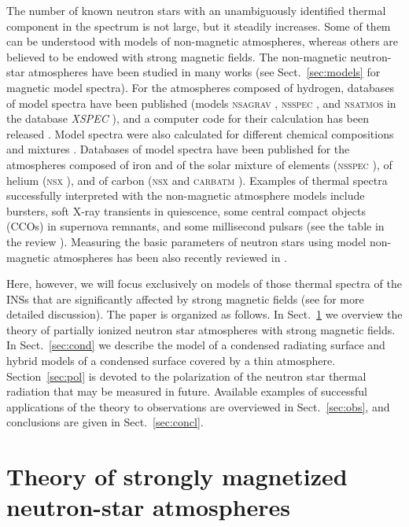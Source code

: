 \documentclass{pos1}
\begin{document}
The number of known neutron stars with an unambiguously identified
thermal component in the spectrum is not large, but it steadily
increases. Some of them can be understood with models of non-magnetic
atmospheres, whereas others are believed to be endowed with strong
magnetic fields. The non-magnetic neutron-star
atmospheres have been studied in many works
(see Sect.~\ref{sec:models} for magnetic model spectra).
For the atmospheres composed of hydrogen, databases of model spectra 
have been published (models \textsc{nsagrav} \cite{ZavlinPS96},
\textsc{nsspec} \cite{GaensickeBR02}, and \textsc{nsatmos}
\cite{Heinke_ea06} in the database \textit{XSPEC} \cite{XSPEC}), and a
computer code for their calculation has been released
\cite{Haakonsen_ea12}. Model spectra were also calculated for
different chemical compositions
\cite{GaensickeBR02,RajagopalRomani96,Pons_ea02,Heinke_ea06,HoHeinke09,Suleimanov_ea14}
and mixtures \cite{GaensickeBR02,Pons_ea02}. Databases of model
spectra have been published for the atmospheres
composed of iron and of the solar mixture of elements (\textsc{nsspec}
\cite{GaensickeBR02}), of helium (\textsc{nsx} \cite{HoHeinke09}), and
of carbon (\textsc{nsx} \cite{HoHeinke09} and \textsc{carbatm}
\cite{Suleimanov_ea14}). Examples of thermal spectra 
successfully interpreted with the non-magnetic atmosphere models
include bursters, soft X-ray
transients in quiescence, some central compact objects (CCOs) in
supernova remnants, and some millisecond pulsars (see the table in
the review \cite{P14}). Measuring the basic parameters of neutron
stars using model non-magnetic atmospheres has been also recently
reviewed in \cite{Suleimanov_ea16}.

Here, however, we will focus exclusively on models of
those thermal spectra of the INSs that are significantly affected by
strong magnetic fields
(see \cite{P14} for more detailed discussion).
The paper is organized as follows. In
Sect.~\ref{sec:theory} we overview the theory of partially ionized
neutron star atmospheres with strong magnetic fields. In
Sect.~\ref{sec:cond} we describe the model of a condensed
radiating surface and hybrid models of a condensed surface covered by a thin
atmosphere. Section~\ref{sec:pol} is devoted to the polarization of
the neutron star thermal radiation that may be measured in future.
Available examples of successful applications of the theory to
observations are overviewed in Sect.~\ref{sec:obs}, and conclusions
are given in Sect.~\ref{sec:concl}.

\section{Theory of strongly magnetized neutron-star atmospheres}
\label{sec:theory}
\end{document}
